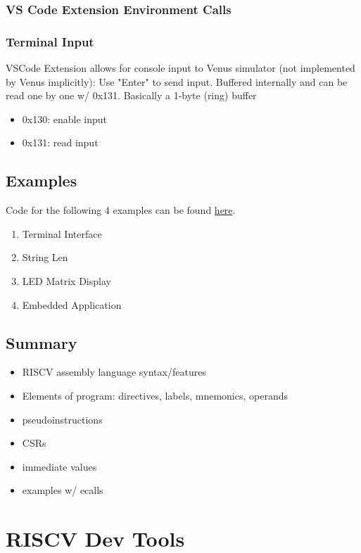 \documentclass[10pt,a4paper]{article}
\begin{document}
      \subsubsection{VS Code Extension Environment Calls}
      \subsubsection{Terminal Input}
        VSCode Extension allows for console input to Venus simulator (not implemented by Venus implicitly): Use "Enter" to send input. Buffered internally and can be read one by one w/ 0x131. Basically a 1-byte (ring) buffer
        \begin{itemize}
          \item 0x130: enable input
          \item 0x131: read input
        \end{itemize}
    \subsection{Examples}
      Code for the following 4 examples can be found \href{https://github.com/lftraining/LFD110x/tree/main/src}{here}.
      \begin{enumerate}
        \item Terminal Interface
        \item String Len
        \item LED Matrix Display
        \item Embedded Application
      \end{enumerate}
    \subsection{Summary}
      \begin{itemize}
        \item RISCV assembly language syntax/features
        \item Elements of program: directives, labels, mnemonics, operands
        \item pseudoinstructions
        \item CSRs
        \item immediate values
        \item examples w/ ecalls
      \end{itemize}
\section{RISCV Dev Tools}
\end{document}

